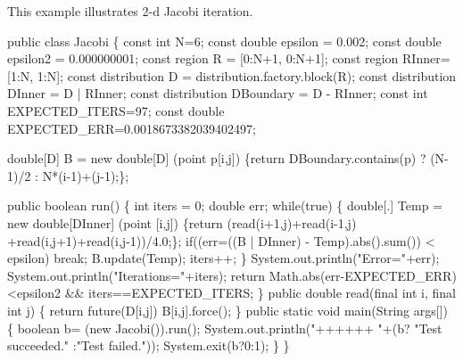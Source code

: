 
This example illustrates 2-d Jacobi iteration.

\begin{x10}
 public class Jacobi  \{
   const int N=6;
   const double epsilon = 0.002;
   const double epsilon2 = 0.000000001;
   const region R = [0:N+1, 0:N+1];
   const region RInner= [1:N, 1:N];
   const distribution D = distribution.factory.block(R);
   const distribution DInner = D | RInner;
   const distribution DBoundary = D - RInner;
   const int EXPECTED\_ITERS=97;
   const double EXPECTED\_ERR=0.0018673382039402497;
     
   double[D] B = new double[D] (point p[i,j])
       \{return DBoundary.contains(p) 
                ? (N-1)/2 : N*(i-1)+(j-1);\};
    
   public boolean run() \{
      int iters = 0;
      double err;
      while(true) \{
        double[.] Temp = 
           new double[DInner] (point [i,j]) 
             \{return (read(i+1,j)+read(i-1,j)
                      +read(i,j+1)+read(i,j-1))/4.0;\};       
        if((err=((B | DInner) - Temp).abs().sum()) < epsilon)
           break; 
        B.update(Temp);
        iters++; 
      \}
      System.out.println("Error="+err);
      System.out.println("Iterations="+iters);
      return Math.abs(err-EXPECTED\_ERR)<epsilon2 
          \&\& iters==EXPECTED\_ITERS;
   \}
   public double read(final int i, final int j) \{
      return future(D[i,j]) {B[i,j]}.force();
   \}
   public static void main(String args[]) \{
      boolean b= (new Jacobi()).run();
      System.out.println("++++++ "+(b? "Test succeeded."
                                     :"Test failed."));
      System.exit(b?0:1);
   \}
\}
\end{x10}
